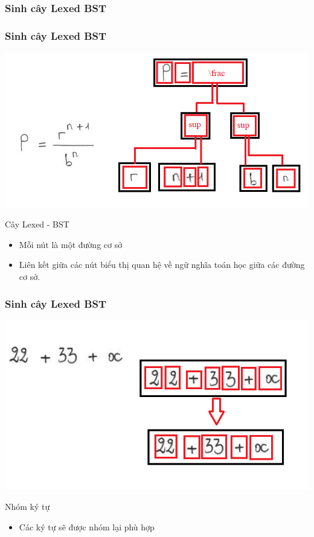 \documentclass{beamer}
\begin{document}
\subsubsection{Sinh cây Lexed BST}
\begin{frame}
	\frametitle{Sinh cây Lexed BST}
	\begin{center}
		\centering
		\includegraphics[width=0.6\linewidth]{lexBST.png}
	\end{center}
	\begin{block}{Cây Lexed - BST}
		\begin{itemize}
			\item Mỗi nút là một đường cơ sở
			\item Liên kết giữa các nút biểu thị quan hệ về ngữ nghĩa toán học giữa các đường cơ sở.
		\end{itemize}
	\end{block}
\end{frame}


\begin{frame}
	\frametitle{Sinh cây Lexed BST}
	\begin{center}
		\centering
		\includegraphics[width=0.6\linewidth]{nhom.png}
	\end{center}
	
	\begin{block}{Nhóm ký tự}
		\begin{itemize}
			\item Các ký tự sẽ được nhóm lại phù hợp
		\end{itemize}
	\end{block}
	
\end{frame}
\end{document}
